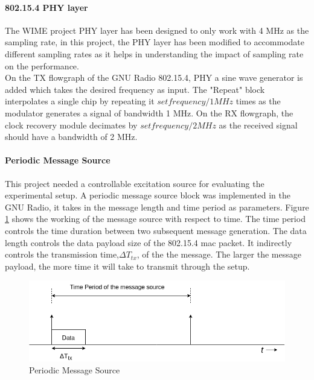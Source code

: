 \paragraph{802.15.4 \ac{PHY} layer}

The WIME project \ac{PHY} layer has been designed to only work with 4 MHz as the sampling rate, in this project, the \ac{PHY} layer has been modified to accommodate different sampling rates as it helps in understanding the impact of sampling rate on the performance.\\

On the TX flowgraph of the GNU Radio 802.15.4, \ac{PHY} a sine wave generator is added which takes the desired frequency as input.
The "Repeat" block interpolates a single chip by repeating it $set frequency/1 MHz$ times as the modulator generates a signal of bandwidth 1 MHz.
On the RX flowgraph, the clock recovery module decimates by $set frequency/2 MHz$ as the received signal should have a bandwidth of 2 MHz.

\paragraph{Periodic Message Source} \label{Periodic Message Source}
This project needed a controllable excitation source for evaluating the experimental setup.
A periodic message source block was implemented in the GNU Radio, it takes in the message length and time period as parameters.
Figure \ref{message_source} shows the working of the message source with respect to time.
The time period controls the time duration between two subsequent message generation.
The data length controls the data payload size of the 802.15.4 \ac{mac} packet.
It indirectly controls the transmission time,$\Delta T_{tx}$, of the the message.
The larger the message payload, the more time it will take to transmit through the setup. 
\\

\begin{figure}[h!]
\centering
\includegraphics[width=\textwidth]{Figure/Message_Source.png}
\caption{Periodic Message Source}
\label{message_source}
\end{figure}

